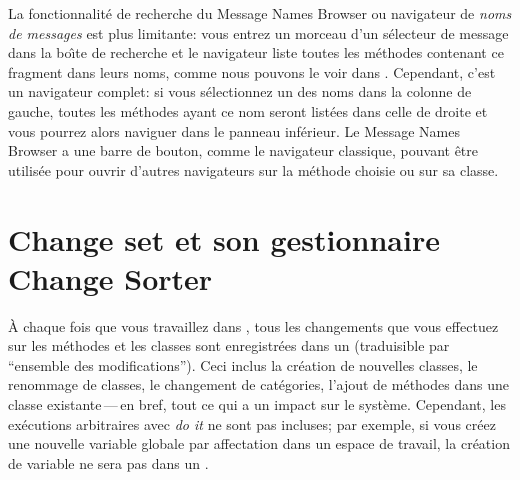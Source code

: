 \documentclass[a4paper,10pt,twoside]{book}
\begin{document}
La fonctionnalit\'e de recherche du Message Names Browser ou navigateur de 
\emph{noms de messages} est plus limitante: vous entrez un morceau d'un s\'electeur de 
message dans la bo\^{\i}te de recherche et le navigateur liste toutes les m\'ethodes
contenant ce fragment dans leurs noms, comme nous pouvons le voir dans
.
Cependant, c'est un navigateur complet:
si vous s\'electionnez un des noms dans la colonne de gauche, toutes les m\'ethodes
ayant ce nom seront list\'ees dans celle de droite et vous pourrez alors naviguer dans
le panneau inf\'erieur.
Le Message Names Browser a une barre de bouton, comme le navigateur classique,
pouvant \^etre utilis\'ee pour ouvrir d'autres navigateurs sur la m\'ethode choisie
ou sur sa classe.

\section{Change set et son gestionnaire Change Sorter}
\label{sec:env:changeSet} %

\`A chaque fois que vous travaillez dans \pharo, tous les changements que vous effectuez
sur les m\'ethodes et les classes sont enregistr\'ees dans un
 (traduisible par ``ensemble des modifications'').
Ceci inclus la cr\'eation de nouvelles classes, le renommage de classes, le changement de
cat\'egories, l'ajout de m\'ethodes dans une classe existante\,---\,en bref, tout ce qui a un impact sur le syst\`eme.
Cependant, les ex\'ecutions arbitraires avec \emph{do it} ne sont pas
incluses; par exemple, si vous cr\'eez une nouvelle variable globale par affectation dans 
un espace de travail, la cr\'eation de variable ne sera pas dans un 
.
\end{document}

